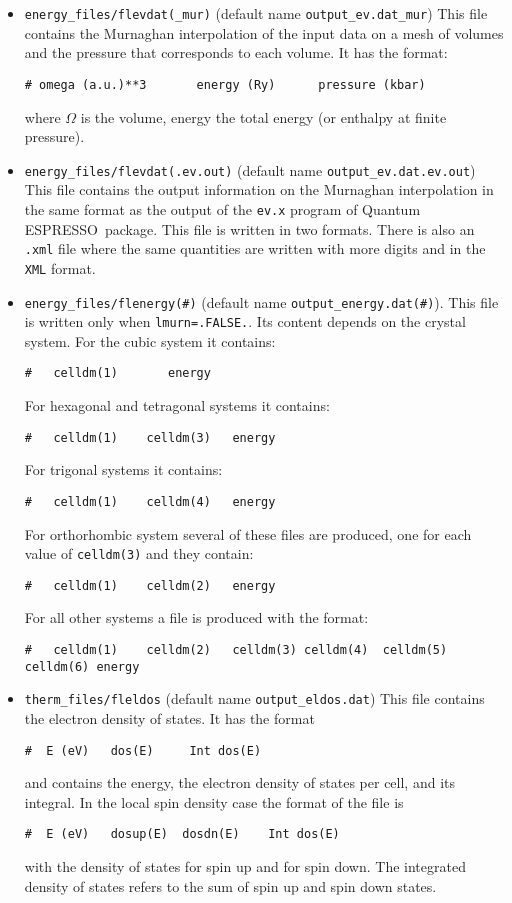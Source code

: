 \documentclass[12pt,a4paper]{article}
\def\qe{{\sc Quantum ESPRESSO}}
\begin{document}
\begin{itemize}
\item 
\texttt{energy\_files/flevdat(\_mur)} 
(default name \texttt{output\_ev.dat\_mur})
This file contains the Murnaghan interpolation of the input data on a 
mesh of volumes and the pressure that corresponds to each volume. It has
the format:
\begin{verbatim}
# omega (a.u.)**3       energy (Ry)      pressure (kbar)
\end{verbatim}
where $\Omega$ is the volume, energy the total energy (or enthalpy at finite
pressure).

\item 
\texttt{energy\_files/flevdat(.ev.out)} 
(default name \texttt{output\_ev.dat.ev.out})
This file contains the output information on the Murnaghan interpolation 
in the same format as the output of the \texttt{ev.x} program of 
\qe\ package. This file is written in two formats.
There is also an \texttt{.xml} file where the same quantities are written 
with more digits and in the \texttt{XML} format.

\item 
\texttt{energy\_files/flenergy(\#)} 
(default name \texttt{output\_energy.dat(\#)}). This file is written only
when \texttt{lmurn=.FALSE.}. Its content depends on the crystal system.
For the cubic system it contains:
\begin{verbatim}
#   celldm(1)       energy
\end{verbatim}
For hexagonal and tetragonal systems it contains:
\begin{verbatim}
#   celldm(1)    celldm(3)   energy
\end{verbatim}
For trigonal systems it contains:
\begin{verbatim}
#   celldm(1)    celldm(4)   energy
\end{verbatim}
For orthorhombic system several of these files are produced, one for each
value of \texttt{celldm(3)} and they contain:
\begin{verbatim}
#   celldm(1)    celldm(2)   energy
\end{verbatim}
For all other systems a file is produced with the format:
\begin{verbatim}
#   celldm(1)    celldm(2)   celldm(3) celldm(4)  celldm(5) celldm(6) energy
\end{verbatim}

\item 
\texttt{therm\_files/fleldos} (default name \texttt{output\_eldos.dat})
This file contains the electron density of states. It has the format
\begin{verbatim}
#  E (eV)   dos(E)     Int dos(E)
\end{verbatim}
and contains the energy, the electron density of states per cell, and
its integral. In the local spin density case the format of the file is
\begin{verbatim}
#  E (eV)   dosup(E)  dosdn(E)    Int dos(E)
\end{verbatim}
with the density of states for spin up and for spin down. The integrated
density of states refers to the sum of spin up and spin down states.


\end{itemize}
\end{document}
